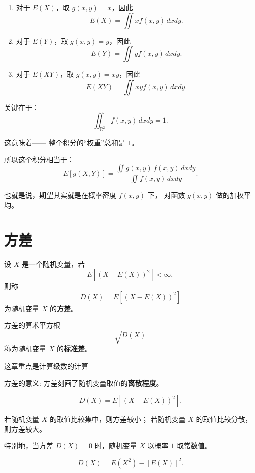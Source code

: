 \begin{note}[我们关心的三种特殊情形]
\begin{enumerate}
  \item 对于 $E(X)$，取 $g(x,y)=x$，因此
  \[
  E(X) = \iint x f(x,y)\,dxdy.
  \]

  \item 对于 $E(Y)$，取 $g(x,y)=y$，因此
  \[
  E(Y) = \iint y f(x,y)\,dxdy.
  \]

  \item 对于 $E(XY)$，取 $g(x,y)=xy$，因此
  \[
  E(XY) = \iint xy f(x,y)\,dxdy.
  \]
\end{enumerate}
\end{note}
\begin{note}[积分中的“平均”思想]
关键在于：
\[
\iint_{\mathbb{R}^2} f(x,y)\,dxdy = 1.
\]

这意味着——  
整个积分的“权重”总和是 \(1\)。

所以这个积分相当于：
\[
E[g(X,Y)] 
= \frac{\displaystyle \iint g(x,y)\,f(x,y)\,dxdy}
{\displaystyle \iint f(x,y)\,dxdy}.
\]

也就是说，期望其实就是在概率密度 \(f(x,y)\) 下，
对函数 \(g(x,y)\) 做的加权平均。
\end{note}
\section{方差}
\begin{definition}[方差与标准差]
设 $X$ 是一个随机变量，若 
\[
E[(X - E(X))^2] < \infty,
\]
则称
\[
D(X) = E\!\left[(X - E(X))^2\right]
\]
为随机变量 $X$ 的\textbf{方差}。

方差的算术平方根
\[
\sqrt{D(X)}
\]
称为随机变量 $X$ 的\textbf{标准差}。
\end{definition}
这章重点是计算级数的计算

\begin{note}方差的意义:
方差刻画了随机变量取值的\textbf{离散程度}。

\[
D(X) = E\!\left[(X - E(X))^2\right].
\]

若随机变量 $X$ 的取值比较集中，则方差较小；  
若随机变量 $X$ 的取值比较分散，则方差较大。

特别地，当方差 $D(X)=0$ 时，随机变量 $X$ 以概率 $1$ 取常数值。
\end{note}
\begin{theorem}[方差的简化公式]
\[
D(X) = E(X^2) - [E(X)]^2.
\]
\end{theorem}

